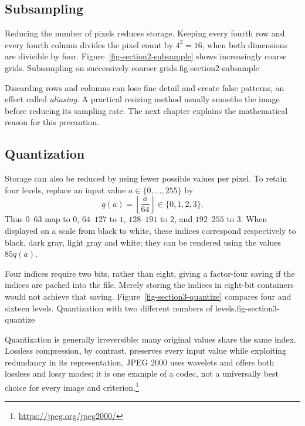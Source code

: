 \subsection{Subsampling}
Reducing the number of pixels reduces storage. Keeping every fourth row and every fourth column divides the pixel count by $4^2=16$, when both dimensions are divisible by four. Figure~\ref{fig-section2-subsample} shows increasingly coarse grids.
{Subsampling on successively coarser grids.}{fig-section2-subsample}

Discarding rows and columns can lose fine detail and create false patterns, an effect called \emph{aliasing}. A practical resizing method usually smooths the image before reducing its sampling rate. The next chapter explains the mathematical reason for this precaution.

\subsection{Quantization}
Storage can also be reduced by using fewer possible values per pixel. To retain four levels, replace an input value $a\in\{0,\ldots,255\}$ by
\[
 q(a)=\left\lfloor\frac a{64}\right\rfloor\in\{0,1,2,3\}.
\]
Thus $0$--$63$ map to $0$, $64$--$127$ to $1$, $128$--$191$ to $2$, and $192$--$255$ to $3$. When displayed on a scale from black to white, these indices correspond respectively to black, dark gray, light gray and white; they can be rendered using the values $85q(a)$.

Four indices require two bits, rather than eight, giving a factor-four saving if the indices are packed into the file. Merely storing the indices in eight-bit containers would not achieve that saving. Figure~\ref{fig-section3-quantize} compares four and sixteen levels.
{Quantization with two different numbers of levels.}{fig-section3-quantize}

Quantization is generally irreversible: many original values share the same index. Lossless compression, by contrast, preserves every input value while exploiting redundancy in its representation. JPEG 2000 uses wavelets and offers both lossless and lossy modes; it is one example of a codec, not a universally best choice for every image and criterion.\footnote{\url{https://jpeg.org/jpeg2000/}}

